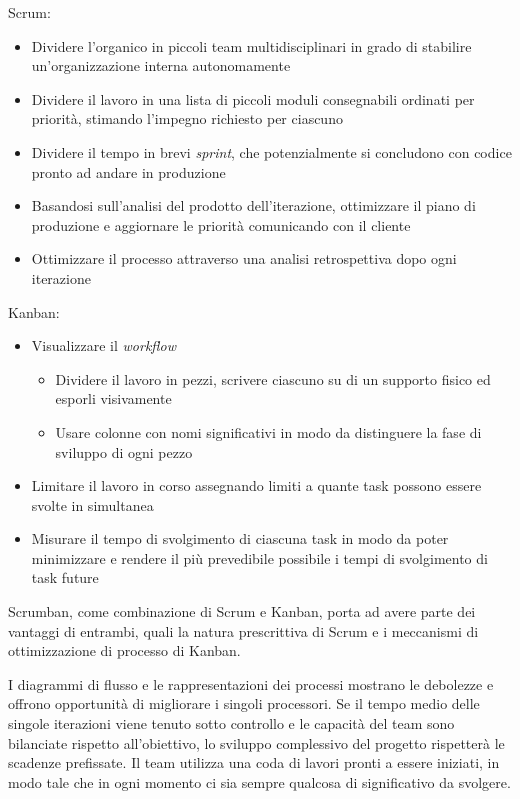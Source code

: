\begin{multicols}{2}
Scrum:\\
\begin{itemize}
\item
Dividere l'organico in piccoli team multidisciplinari in grado di stabilire un'organizzazione interna autonomamente
\item
Dividere il lavoro in una lista di piccoli moduli consegnabili ordinati per priorità, stimando l'impegno richiesto per ciascuno
\item
Dividere il tempo in brevi \textit{sprint}, che potenzialmente si concludono con codice pronto ad andare in produzione
\item
Basandosi sull'analisi del prodotto dell'iterazione, ottimizzare il piano di produzione e aggiornare le priorità comunicando con il cliente
\item
Ottimizzare il processo attraverso una analisi retrospettiva dopo ogni iterazione
\end{itemize}
\columnbreak
Kanban:
\begin{itemize}
\item
Visualizzare il \textit{workflow}
\begin{itemize}
\item
Dividere il lavoro in pezzi, scrivere ciascuno su di un supporto fisico ed esporli visivamente
\item
Usare colonne con nomi significativi in modo da distinguere la fase di sviluppo di ogni pezzo
\end{itemize}
\item
Limitare il lavoro in corso assegnando limiti a quante task possono essere svolte in simultanea
\item
Misurare il tempo di svolgimento di ciascuna task in modo da poter minimizzare e rendere il più prevedibile possibile i tempi di svolgimento di task future
\end{itemize}
\end{multicols}

Scrumban, come combinazione di Scrum e Kanban, porta ad avere parte dei vantaggi di entrambi, quali la natura prescrittiva di Scrum e i meccanismi di ottimizzazione di processo di Kanban.

I diagrammi di flusso e le rappresentazioni dei processi mostrano le debolezze e offrono opportunità di migliorare i singoli processori.
Se il tempo medio delle singole iterazioni viene tenuto sotto controllo e le capacità del team sono bilanciate rispetto all'obiettivo, lo sviluppo complessivo del progetto rispetterà le scadenze prefissate.
Il team utilizza una coda di lavori pronti a essere iniziati, in modo tale che in ogni momento ci sia sempre qualcosa di significativo da svolgere. \cite{SCRUMBAN}
